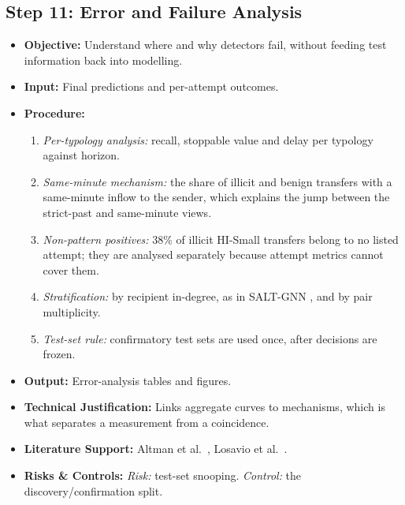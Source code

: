 \documentclass[11pt,a4paper]{article}
\begin{document}
\subsection{Step 11: Error and Failure Analysis}
\begin{itemize}[leftmargin=*]
    \item \textbf{Objective:} Understand where and why detectors fail, without feeding test information back into modelling.
    \item \textbf{Input:} Final predictions and per-attempt outcomes.
    \item \textbf{Procedure:}
    \begin{enumerate}[leftmargin=*]
        \item \textit{Per-typology analysis:} recall, stoppable value and delay per typology against horizon.
        \item \textit{Same-minute mechanism:} the share of illicit and benign transfers with a same-minute inflow to the sender, which explains the jump between the strict-past and same-minute views.
        \item \textit{Non-pattern positives:} 38\% of illicit HI-Small transfers belong to no listed attempt; they are analysed separately because attempt metrics cannot cover them.
        \item \textit{Stratification:} by recipient in-degree, as in SALT-GNN \cite{losavio2026saltgnn}, and by pair multiplicity.
        \item \textit{Test-set rule:} confirmatory test sets are used once, after decisions are frozen.
    \end{enumerate}
    \item \textbf{Output:} Error-analysis tables and figures.
    \item \textbf{Technical Justification:} Links aggregate curves to mechanisms, which is what separates a measurement from a coincidence.
    \item \textbf{Literature Support:} Altman et al.\ \cite{altman2023ibmaml}, Losavio et al.\ \cite{losavio2026saltgnn}.
    \item \textbf{Risks \& Controls:} \textit{Risk:} test-set snooping. \textit{Control:} the discovery/confirmation split.
\end{itemize}

\end{document}
